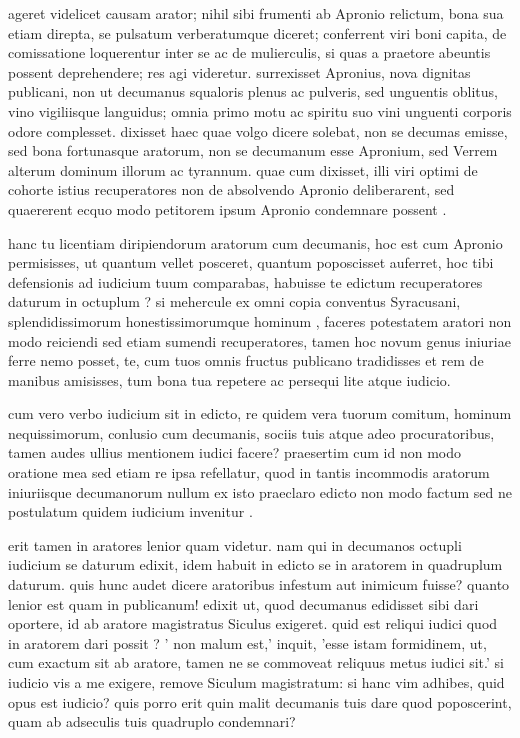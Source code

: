  ageret videlicet causam arator; nihil sibi frumenti ab Apronio relictum, bona sua etiam direpta, se pulsatum verberatumque diceret; conferrent viri boni capita, de comissatione loquerentur inter se ac de mulierculis, si quas a praetore abeuntis possent deprehendere; res agi videretur. surrexisset Apronius, nova dignitas publicani, non ut decumanus squaloris plenus ac pulveris, sed unguentis oblitus, vino vigiliisque languidus; omnia primo motu ac spiritu suo vini unguenti corporis odore complesset. dixisset haec quae volgo dicere solebat, non se decumas emisse, sed bona fortunasque aratorum, non se decumanum esse Apronium, sed Verrem alterum dominum illorum ac tyrannum. quae cum dixisset, illi viri optimi de cohorte istius recuperatores non de absolvendo Apronio deliberarent, sed quaererent ecquo modo petitorem ipsum Apronio condemnare possent .

 hanc tu licentiam diripiendorum aratorum cum decumanis, hoc est cum Apronio permisisses, ut quantum vellet posceret, quantum poposcisset auferret, hoc tibi defensionis ad iudicium tuum comparabas, habuisse te edictum recuperatores daturum in octuplum ? si mehercule ex omni copia conventus Syracusani, splendidissimorum honestissimorumque hominum , faceres potestatem aratori non modo reiciendi sed etiam sumendi recuperatores, tamen hoc novum genus iniuriae ferre nemo posset, te, cum tuos omnis fructus publicano tradidisses et rem de manibus amisisses, tum bona tua repetere ac persequi lite atque iudicio.

 cum vero verbo iudicium sit in edicto, re quidem vera tuorum comitum, hominum nequissimorum, conlusio cum decumanis, sociis tuis atque adeo procuratoribus, tamen audes ullius mentionem iudici facere? praesertim cum id non modo oratione mea sed etiam re ipsa refellatur, quod in tantis incommodis aratorum iniuriisque decumanorum nullum ex isto praeclaro edicto non modo factum sed ne postulatum quidem iudicium invenitur .

 erit tamen in aratores lenior quam videtur. nam qui in decumanos octupli iudicium se daturum edixit, idem habuit in edicto se in aratorem in quadruplum daturum. quis hunc audet dicere aratoribus infestum aut inimicum fuisse? quanto lenior est quam in publicanum! edixit ut, quod decumanus edidisset sibi dari oportere, id ab aratore magistratus Siculus exigeret. quid est reliqui iudici quod in aratorem dari possit ? ' non malum est,' inquit, 'esse istam formidinem, ut, cum exactum sit ab aratore, tamen ne se commoveat reliquus metus iudici sit.' si iudicio vis a me exigere, remove Siculum magistratum: si hanc vim adhibes, quid opus est iudicio? quis porro erit quin malit decumanis tuis dare quod poposcerint, quam ab adseculis tuis quadruplo condemnari?

